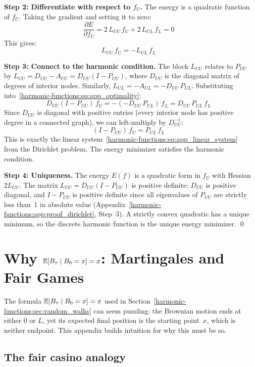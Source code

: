\begin{notechapter}
\textbf{Step 2: Differentiate with respect to $f_U$.} The energy is a
quadratic function of $f_U$. Taking the gradient and setting it to zero:
\[
\frac{\partial E}{\partial f_U} = 2\,L_{UU}\,f_U + 2\,L_{UL}\,f_L = 0
\]
This gives:
\begin{equation}
\label{harmonic-functions:eq:app_optimality}
L_{UU}\,f_U = -L_{UL}\,f_L
\end{equation}

\textbf{Step 3: Connect to the harmonic condition.} The block $L_{UU}$
relates to $P_{UU}$ by $L_{UU} = D_{UU} - A_{UU} = D_{UU}(I - P_{UU})$,
where $D_{UU}$ is the diagonal matrix of degrees of interior nodes.
Similarly, $L_{UL} = -A_{UL} = -D_{UU}\,P_{UL}$. Substituting
into~\eqref{harmonic-functions:eq:app_optimality}:
\[
D_{UU}(I - P_{UU})\,f_U = -(-D_{UU}\,P_{UL})\,f_L = D_{UU}\,P_{UL}\,f_L
\]
Since $D_{UU}$ is diagonal with positive entries (every interior node has
positive degree in a connected graph), we can left-multiply by
$D_{UU}^{-1}$:
\[
(I - P_{UU})\,f_U = P_{UL}\,f_L
\]
This is exactly the linear system~\eqref{harmonic-functions:eq:app_linear_system} from the
Dirichlet problem. The energy minimizer satisfies the harmonic condition.

\textbf{Step 4: Uniqueness.} The energy $E(f)$ is a quadratic form in $f_U$
with Hessian $2L_{UU}$. The matrix $L_{UU} = D_{UU}(I - P_{UU})$ is
positive definite: $D_{UU}$ is positive diagonal, and $I - P_{UU}$ is
positive definite since all eigenvalues of $P_{UU}$ are strictly less
than~$1$ in absolute value (Appendix~\ref{harmonic-functions:app:proof_dirichlet}, Step~3).
A strictly convex quadratic has a unique minimum, so the discrete harmonic
function is the unique energy minimizer. \qed

\newpage
\section{Why $\mathbb{E}[B_\tau \mid B_0 = x] = x$: Martingales and Fair Games}
\label{harmonic-functions:app:martingale}

The formula $\mathbb{E}[B_\tau \mid B_0 = x] = x$ used in
Section~\ref{harmonic-functions:sec:random_walks} can seem puzzling: the Brownian motion ends
at either $0$ or $L$, yet its expected final position is the starting
point~$x$, which is neither endpoint. This appendix builds intuition for
why this must be so.

\subsection*{The fair casino analogy}


\end{notechapter}

